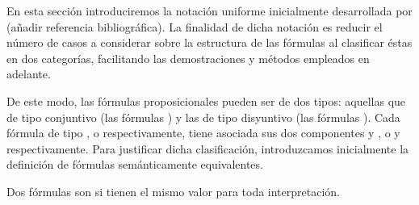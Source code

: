 %
\begin{isabellebody}%
%
%
\isadelimtheory
%
\endisadelimtheory
%
\isatagtheory
%
\endisatagtheory
{\isafoldtheory}%
%
\isadelimtheory
%
\endisadelimtheory
%
\begin{isamarkuptext}%
%
\end{isamarkuptext}\isamarkuptrue%
%
\begin{isamarkuptext}%
En esta sección introduciremos la notación uniforme inicialmente 
  desarrollada por  (añadir referencia bibliográfica). La finalidad
  de dicha notación es reducir el número de casos a considerar sobre la estructura de 
  las fórmulas al clasificar éstas en dos categorías, facilitando las demostraciones
  y métodos empleados en adelante.


  De este modo, las fórmulas proposicionales pueden ser de dos tipos: aquellas que 
  de tipo conjuntivo (las fórmulas \isa{{\isasymalpha}}) y las de tipo disyuntivo (las fórmulas \isa{{\isasymbeta}}). 
  Cada fórmula de tipo \isa{{\isasymalpha}}, o \isa{{\isasymbeta}} respectivamente, tiene asociada sus  
  dos componentes  y , o  y  respectivamente. Para justificar dicha clasificación,
  introduzcamos inicialmente la definición de fórmulas semánticamente equivalentes.

  \begin{definicion}
    Dos fórmulas son  si tienen el mismo valor para toda 
    interpretación.
  \end{definicion}


\end{isamarkuptext}
\end{isabellebody}
